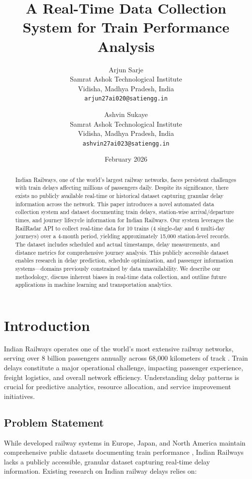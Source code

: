 \documentclass[11pt,a4paper]{article}
\title{A Real-Time Data Collection System for Train Performance Analysis}
\author{
    Arjun Sarje \\
    Samrat Ashok Technological Institute \\
    Vidisha, Madhya Pradesh, India \\
    \texttt{arjun27ai020@satiengg.in}
    \and
    Ashvin Sukaye \\
    Samrat Ashok Technological Institute \\
    Vidisha, Madhya Pradesh, India \\
    \texttt{ashvin27ai023@satiengg.in}
}
\date{February 2026}
\begin{document}
\maketitle

\begin{abstract}
Indian Railways, one of the world's largest railway networks, faces persistent challenges with train delays affecting millions of passengers daily. Despite its significance, there exists no publicly available real-time or historical dataset capturing granular delay information across the network. This paper introduces a novel automated data collection system and dataset documenting train delays, station-wise arrival/departure times, and journey lifecycle information for Indian Railways. Our system leverages the RailRadar API to collect real-time data for 10 trains (4 single-day and 6 multi-day journeys) over a 4-month period, yielding approximately 15,000 station-level records. The dataset includes scheduled and actual timestamps, delay measurements, and distance metrics for comprehensive journey analysis. This publicly accessible dataset enables research in delay prediction, schedule optimization, and passenger information systems—domains previously constrained by data unavailability. We describe our methodology, discuss inherent biases in real-time data collection, and outline future applications in machine learning and transportation analytics.
\end{abstract}

\section{Introduction}

Indian Railways operates one of the world's most extensive railway networks, serving over 8 billion passengers annually across 68,000 kilometers of track \cite{indian_railways_stats}. Train delays constitute a major operational challenge, impacting passenger experience, freight logistics, and overall network efficiency. Understanding delay patterns is crucial for predictive analytics, resource allocation, and service improvement initiatives.

\subsection{Problem Statement}

While developed railway systems in Europe, Japan, and North America maintain comprehensive public datasets documenting train performance \cite{uk_rail_data, german_rail_data}, Indian Railways lacks a publicly accessible, granular dataset capturing real-time delay information. Existing research on Indian railway delays relies on:
\end{document}

